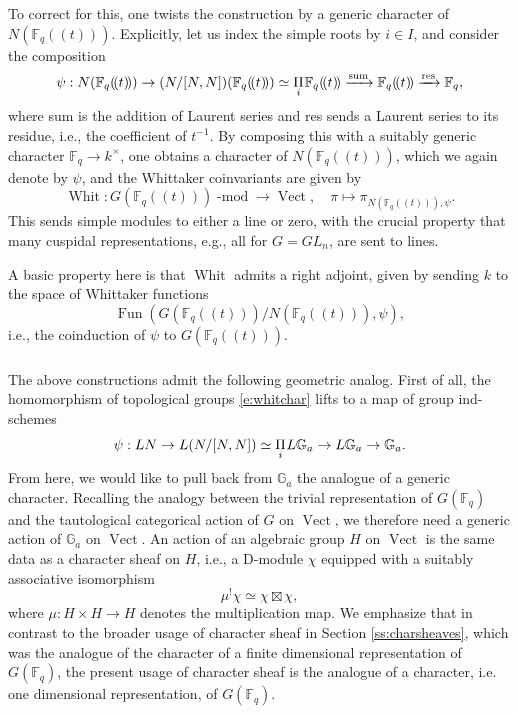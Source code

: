 \documentclass[10pt]{amsart}
\newcommand{\Fqt}{\Fq(\!(t)\!)}
\newcommand{\on}{\operatorname}
\renewcommand{\mod}{\on{-mod}}
\newcommand{\Fq}{\mathbb{F}_q}
\newcommand{\Fun}{\on{Fun}}
\newcommand{\Vect}{\on{Vect}}
\theoremstyle{remark}
\numberwithin{equation}{section}
\renewcommand{\mod}{\operatorname{-mod}}
\begin{document}
To correct for this, one twists the construction by a generic character of 
$N(\Fqt)$. Explicitly, let us index the simple roots by $i \in I$, and consider 
the 
composition 
%
\begin{equation} \label{e:whitchar}
\psi:  N(\Fqt) \rightarrow (N/[N,N])(\Fqt) \simeq \underset{i} \Pi 
\hspace{.2mm} 
\Fqt \xrightarrow{\on{sum}} \Fqt 
\xrightarrow{\on{res}} \Fq,
\end{equation}
%
where sum is the addition of Laurent series and res sends a Laurent series to 
its residue, i.e., the coefficient of $t^{-1}$. By composing this with a 
suitably generic character $\mathbb{F}_q \rightarrow k^\times$, one obtains a 
character of $N(\Fqt)$, which we again denote by $\psi$, and the Whittaker 
coinvariants are given by 
%
\[
   \on{Whit}: G(\Fqt)\mod \rightarrow \Vect, \quad \pi \mapsto \pi_{N(\Fqt), 
   \psi}. 
\]
%	
This sends simple modules to either a line or zero, with the crucial property 
that many cuspidal representations, e.g., all for $G = GL_n$, are sent to 
lines. 

A basic property here is that $\on{Whit}$ admits a right adjoint, given by 
sending $k$ to the space of Whittaker functions 
%
\[
     \Fun( G(\Fqt) / N(\Fqt), \psi),  
\]
%
i.e., the coinduction of $\psi$ to $G(\Fqt)$.

\subsubsection{}
The above constructions admit the following geometric analog. First of all, the 
homomorphism of topological groups \eqref{e:whitchar} lifts to a map of group 
ind-schemes 
%
\[
      \psi: LN \rightarrow L(N/[N, N]) \simeq \underset i \Pi \hspace{.2mm} 
      L\mathbb{G}_a \rightarrow L\mathbb{G}_a \rightarrow \mathbb{G}_a.
\]
%
From here, we would like to pull back from $\mathbb{G}_a$ the analogue of a 
generic character. Recalling the analogy between the trivial representation of 
$G(\Fq)$ and the tautological categorical action of $G$ on $\Vect$, we 
therefore need a generic action of $\mathbb{G}_a$ on $\on{Vect}$. An action of an 
algebraic group $H$ on $\Vect$ is the same data as a character sheaf on $H$, i.e., 
a D-module $\chi$ equipped with a suitably associative isomorphism 
%
\[
     \mu^! \chi \simeq \chi \boxtimes \chi,
\]
%
where $\mu: H \times H \rightarrow H$ denotes the multiplication map. We emphasize that in contrast to the broader usage of character sheaf in Section \ref{ss:charsheaves}, which was the analogue of the character of a finite dimensional representation of $G(\Fq)$, the present usage of character sheaf is the analogue of a character, i.e. one dimensional representation, of $G(\Fq)$. 
\end{document}
